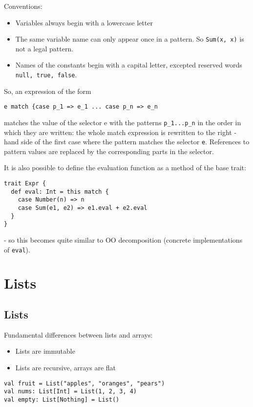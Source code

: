 \documentclass{scrartcl}
\begin{document}
Conventions:
\begin{itemize}
\item Variables always begin with a lowercase letter
\item The same variable name can only appear once in a pattern. So
  \lstinline|Sum(x, x)| is not a legal pattern.
\item Names of the constants begin with a capital letter, excepted reserved
  words \lstinline|null, true, false|.
\end{itemize}

So, an expression of the form
\begin{lstlisting}
e match {case p_1 => e_1 ... case p_n => e_n
\end{lstlisting}
matches the value of the selector e with the patterns \lstinline|p_1...p_n| in
the order in which they are written: the whole match expression is rewritten to
the right - hand side of the first case where the pattern matches the selector
\lstinline|e|. References to pattern values are replaced by the corresponding
parts in the selector.

It is also possible to define the evaluation function as a method of the base
trait:
\begin{lstlisting}
trait Expr {
  def eval: Int = this match {
    case Number(n) => n
    case Sum(e1, e2) => e1.eval + e2.eval
  }
}
\end{lstlisting}
- so this becomes quite similar to OO decomposition (concrete implementations of
\lstinline|eval|).

\section{Lists}
\label{sec:Lists}
\subsection{Lists}
\label{sec:Listsss}

Fundamental differences between lists and arrays:
\begin{itemize}
\item Lists are immutable
\item Lists are recursive, arrays are flat
\end{itemize}

\begin{lstlisting}
val fruit = List("apples", "oranges", "pears")
val nums: List[Int] = List(1, 2, 3, 4)
val empty: List[Nothing] = List()
\end{lstlisting}
\end{document}
